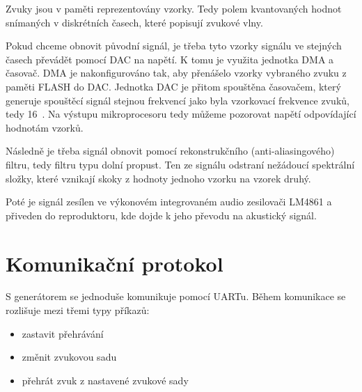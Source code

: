 Zvuky jsou v paměti reprezentovány vzorky. Tedy polem kvantovaných hodnot snímaných v diskrétních časech, které popisují zvukové vlny.

Pokud chceme obnovit původní signál, je třeba tyto vzorky signálu ve stejných časech převádět pomocí DAC na napětí. K tomu je využita jednotka DMA a časovač. DMA je nakonfigurováno tak, aby přenášelo vzorky vybraného zvuku z paměti FLASH do DAC. Jednotka DAC je přitom spouštěna časovačem, který generuje spouštěcí signál stejnou frekvencí jako byla vzorkovací frekvence zvuků, tedy 16~. Na výstupu mikroprocesoru tedy můžeme pozorovat napětí odpovídající hodnotám vzorků.

Následně je třeba signál obnovit pomocí rekonstrukčního (anti-aliasingového) filtru, tedy filtru typu dolní propust. Ten ze signálu odstraní nežádoucí spektrální složky, které vznikají skoky z hodnoty jednoho vzorku na vzorek druhý.

Poté je signál zesílen ve výkonovém integrovaném audio zesilovači LM4861 a přiveden do reproduktoru, kde dojde k jeho převodu na akustický signál.

\section{Komunikační protokol}
S generátorem se jednoduše komunikuje pomocí UARTu. Během komunikace se rozlišuje mezi třemi typy příkazů:
\begin{itemize}
    \item zastavit přehrávání
    \item změnit zvukovou sadu
    \item přehrát zvuk z nastavené zvukové sady
\end{itemize}


